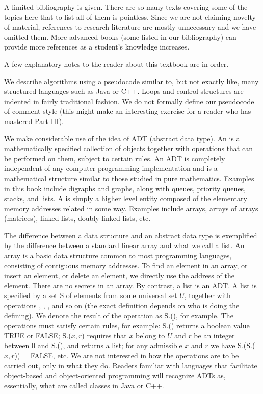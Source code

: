 A limited bibliography is given. There are so many texts covering some
of the topics here that to list all of them is pointless. Since we are
not claiming novelty of material, references to research literature are
mostly unnecessary and we have omitted them. More advanced books (some
listed in our bibliography) can provide more references as a student's
knowledge increases.

A few explanatory notes to the reader about this textbook are in order. 

We describe algorithms using a pseudocode similar to, but not exactly
like, many structured languages such as Java or C++. Loops and control
structures are indented in fairly traditional fashion. We do not formally
define our pseudocode of comment style (this might make an interesting 
exercise for a reader who has mastered Part III).

We make considerable use of the idea of ADT (abstract data type). An
 is a mathematically specified collection of
objects together with operations that can be performed on them, subject
to certain rules. An ADT is completely independent of any computer
programming implementation and is a mathematical structure similar to
those studied in pure mathematics. Examples in this book include digraphs
and graphs, along with queues, priority queues, stacks, and lists. A
 is simply a higher level entity composed of the
elementary memory addresses related in some way. Examples include arrays,
arrays of arrays (matrices), linked lists, doubly linked lists, etc.

The difference between a data structure and an abstract data type is
exemplified by the difference between a standard linear array and what we
call a list. An array is a basic data structure common to most programming
languages, consisting of contiguous memory addresses. To find an element
in an array, or insert an element, or delete an element, we directly
use the address of the element. There are no secrets in an array. By
contrast, a list is an ADT. A list is specified by a set S of elements
from some universal set $U$, together with operations ,
, ,  and so on (the
exact definition depends on who is doing the defining). We denote
the result of the operation as S.(), for example. The
operations must satisfy certain rules, for example: S.()
returns a boolean value TRUE or FALSE; S.($x, r$)
requires that $x$ belong to $U$ and $r$ be an integer between $0$
and S.(), and returns a list; for any admissible $x$ and
$r$ we have S.(S.($x, r$)) = FALSE,
etc. We are not interested in how the operations are to be carried out,
only in what they do. Readers familiar with languages that facilitate
object-based and object-oriented programming will recognize ADTs as,
essentially, what are called classes in Java or C++.


